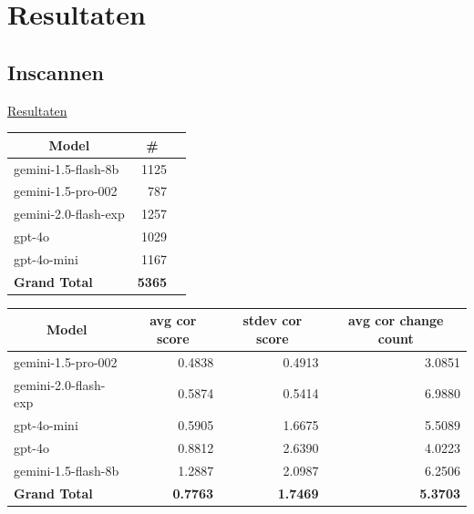\documentclass[12pt]{article}
\begin{document}
\section{Resultaten}
\subsection{Inscannen}


\href{https://docs.google.com/spreadsheets/d/1wbHiG81i-UJ18s6gP3i_WtsPD-FBQTqg7AwNjN8Rm2g}{Resultaten}

\noindent\begin{table}[H]\begin{tabularx}{\textwidth}{X *2{r}}
    \toprule
    \multicolumn{1}{c}{\textbf{Model}} & \multicolumn{1}{c}{\textbf{\#}} \\  %
    \midrule
    gemini-1.5-flash-8b & 1125 \\
    gemini-1.5-pro-002 & 787 \\
    gemini-2.0-flash-exp & 1257 \\
    gpt-4o & 1029 \\
    gpt-4o-mini & 1167 \\
    \midrule
    \textbf{Grand Total} & \textbf{5365} \\
    \bottomrule
\end{tabularx}%
\end{table}

\noindent\begin{table}[H]\begin{tabularx}{\textwidth}{X *3{r}}
    \toprule
    \multicolumn{1}{c}{\textbf{Model}} & \multicolumn{1}{c}{\textbf{avg cor score}} & \multicolumn{1}{c}{\textbf{stdev cor score}} & \multicolumn{1}{c}{\textbf{avg cor change count}} \\
    \midrule
    gemini-1.5-pro-002 & 0.4838 & 0.4913 & 3.0851 \\
    gemini-2.0-flash-exp & 0.5874 & 0.5414 & 6.9880 \\
    gpt-4o-mini & 0.5905 & 1.6675 & 5.5089 \\
    gpt-4o & 0.8812 & 2.6390 & 4.0223 \\
    gemini-1.5-flash-8b & 1.2887 & 2.0987 & 6.2506 \\
    \midrule
    \textbf{Grand Total} & \textbf{0.7763} & \textbf{1.7469} & \textbf{5.3703} \\
    \bottomrule
\end{tabularx}%
\end{table}
\end{document}
